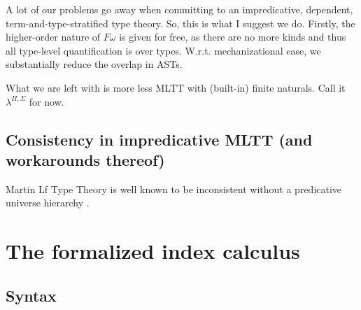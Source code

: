 \documentclass[12pt]{article}
\begin{document}
A lot of our problems go away when committing to an impredicative, dependent, term-and-type-stratified type theory. So, this is what I suggest we do. Firstly, the higher-order nature of $F\omega$ is given for free, as there are no more kinds and thus all type-level quantification is over types. W.r.t. mechanizational ease, we substantially reduce the overlap in ASTs. 

What we are left with is more less MLTT with (built-in) finite naturals. Call it $\lambda^{\Pi,\Sigma}$ for now.

\subsection{Consistency in impredicative MLTT (and workarounds thereof)}

Martin Lf Type Theory is well known to be inconsistent without a predicative universe hierarchy \citet{Hurkens95, MonnierN19, Coquand92}.

\citet{MonnierN19}

\section{The formalized index calculus}
\subsection{Syntax}
\label{sec:Syntax}
\end{document}
